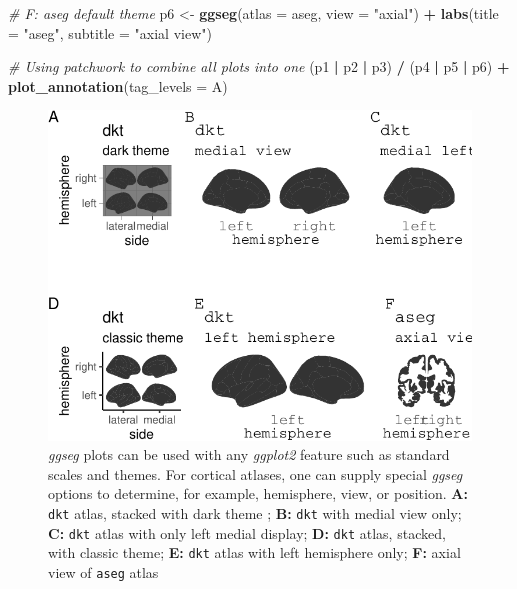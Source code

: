 \documentclass[fleqn,10pt]{wlpeerj} %
\newenvironment{Shaded}{\begin{snugshade}}{\end{snugshade}}
\newcommand{\CommentTok}[1]{\textcolor[rgb]{0.56,0.35,0.01}{\textit{#1}}}
\newcommand{\DataTypeTok}[1]{\textcolor[rgb]{0.13,0.29,0.53}{#1}}
\newcommand{\KeywordTok}[1]{\textcolor[rgb]{0.13,0.29,0.53}{\textbf{#1}}}
\newcommand{\NormalTok}[1]{#1}
\newcommand{\OperatorTok}[1]{\textcolor[rgb]{0.81,0.36,0.00}{\textbf{#1}}}
\newcommand{\StringTok}[1]{\textcolor[rgb]{0.31,0.60,0.02}{#1}}
\begin{document}
\begin{Shaded}
\begin{Highlighting}[]
\CommentTok{\# F: aseg default theme}
\NormalTok{p6 <{-}}\StringTok{ }\KeywordTok{ggseg}\NormalTok{(}\DataTypeTok{atlas =}\NormalTok{ aseg, }\DataTypeTok{view =} \StringTok{"axial"}\NormalTok{) }\OperatorTok{+}
\StringTok{  }\KeywordTok{labs}\NormalTok{(}\DataTypeTok{title =} \StringTok{"aseg"}\NormalTok{, }\DataTypeTok{subtitle =} \StringTok{"axial view"}\NormalTok{)}

\CommentTok{\# Using patchwork to combine all plots into one}
\NormalTok{(p1 }\OperatorTok{|}\StringTok{ }\NormalTok{p2 }\OperatorTok{|}\StringTok{ }\NormalTok{p3) }\OperatorTok{/}\StringTok{ }\NormalTok{(p4 }\OperatorTok{|}\StringTok{ }\NormalTok{p5 }\OperatorTok{|}\StringTok{ }\NormalTok{p6) }\OperatorTok{+}
\StringTok{  }\KeywordTok{plot\_annotation}\NormalTok{(}\DataTypeTok{tag\_levels =} \StringTok{\textquotesingle{}A\textquotesingle{}}\NormalTok{)}
\end{Highlighting}
\end{Shaded}

\begin{figure}
\centering
\includegraphics{msc_ggseg_files/figure-latex/collection-1.pdf}
\caption{\label{fig:collection}\emph{ggseg} plots can be used with any \emph{ggplot2} feature such as standard scales and themes. For cortical atlases, one can supply special \emph{ggseg} options to determine, for example, hemisphere, view, or position. \textbf{A:} \texttt{dkt} atlas, stacked with dark theme ; \textbf{B:} \texttt{dkt} with medial view only; \textbf{C:} \texttt{dkt} atlas with only left medial display; \textbf{D:} \texttt{dkt} atlas, stacked, with classic theme; \textbf{E:} \texttt{dkt} atlas with left hemisphere only; \textbf{F:} axial view of \texttt{aseg} atlas}
\end{figure}
\end{document}
